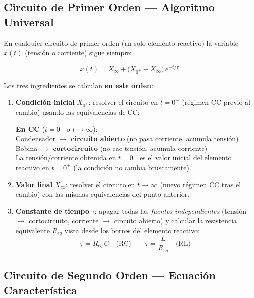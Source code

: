 \documentclass[12pt,a4paper]{article}
\begin{document}
\subsection{Circuito de Primer Orden — Algoritmo Universal}

En cualquier circuito de primer orden (un solo elemento reactivo) la variable $x(t)$
(tensión o corriente) sigue siempre:

\begin{formulabox}
\[
  \boxed{x(t) = X_\infty + \bigl(X_{0^+} - X_\infty\bigr)\,e^{-t/\tau}}
\]
\end{formulabox}

Los tres ingredientes se calculan \textbf{en este orden}:

\begin{enumerate}[leftmargin=2em, itemsep=6pt]

  \item \textbf{Condición inicial} $X_{0^+}$: resolver el circuito en $t = 0^-$
  (régimen CC previo al cambio) usando las equivalencias de CC:
  \begin{formulabox}
    \textbf{En CC} ($t = 0^-$ o $t \to \infty$):\\[4pt]
    \quad Condensador $\longrightarrow$ \textbf{circuito abierto} \quad
    (no pasa corriente, acumula tensión)\\
    \quad Bobina $\longrightarrow$ \textbf{cortocircuito} \quad
    (no cae tensión, acumula corriente)\\[4pt]
    La tensión/corriente obtenida en $t = 0^-$ es el valor inicial del elemento reactivo
    en $t = 0^+$ (la condición no cambia bruscamente).
  \end{formulabox}

  \item \textbf{Valor final} $X_\infty$: resolver el circuito en $t \to \infty$
  (nuevo régimen CC tras el cambio) con las mismas equivalencias del punto anterior.

  \item \textbf{Constante de tiempo} $\tau$: apagar todas las \emph{fuentes independientes}
  (tensión $\to$ cortocircuito, corriente $\to$ circuito abierto) y calcular la resistencia
  equivalente $R_{eq}$ vista desde los bornes del elemento reactivo:
  \[
    \tau = R_{eq}\,C \quad \text{(RC)} \qquad \tau = \frac{L}{R_{eq}} \quad \text{(RL)}
  \]
\end{enumerate}

\subsection{Circuito de Segundo Orden — Ecuación Característica}
\end{document}
